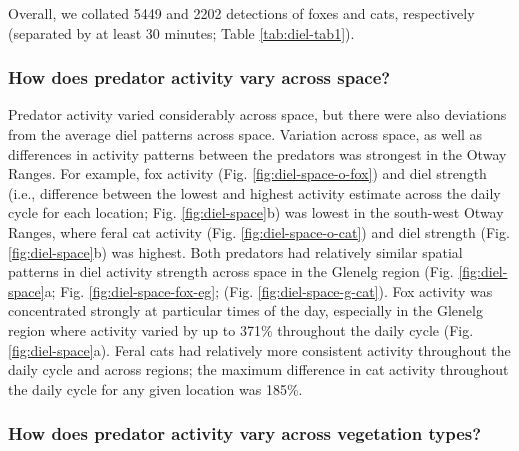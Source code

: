 \documentclass[11pt,a4paper,titlepage,twoside,openright]{style/unimelbthesis}
\begin{document}
\begin{mainmatter}
Overall, we collated 5449 and 2202 detections of foxes and cats, respectively (separated by at least 30 minutes; Table \ref{tab:diel-tab1}).

\hypertarget{how-does-predator-activity-vary-across-space-1}{%
\subsubsection{How does predator activity vary across space?}\label{how-does-predator-activity-vary-across-space-1}}

Predator activity varied considerably across space, but there were also deviations from the average diel patterns across space. Variation across space, as well as differences in activity patterns between the predators was strongest in the Otway Ranges. For example, fox activity (Fig. \ref{fig:diel-space-o-fox}) and diel strength (i.e., difference between the lowest and highest activity estimate across the daily cycle for each location; Fig. \ref{fig:diel-space}b) was lowest in the south-west Otway Ranges, where feral cat activity (Fig. \ref{fig:diel-space-o-cat}) and diel strength (Fig. \ref{fig:diel-space}b) was highest. Both predators had relatively similar spatial patterns in diel activity strength across space in the Glenelg region (Fig. \ref{fig:diel-space}a; Fig. \ref{fig:diel-space-fox-eg}; (Fig. \ref{fig:diel-space-g-cat}). Fox activity was concentrated strongly at particular times of the day, especially in the Glenelg region where activity varied by up to 371\% throughout the daily cycle (Fig. \ref{fig:diel-space}a). Feral cats had relatively more consistent activity throughout the daily cycle and across regions; the maximum difference in cat activity throughout the daily cycle for any given location was 185\%.

\hypertarget{how-does-predator-activity-vary-across-vegetation-types-1}{%
\subsubsection{How does predator activity vary across vegetation types?}\label{how-does-predator-activity-vary-across-vegetation-types-1}}


\end{mainmatter}
\end{document}
